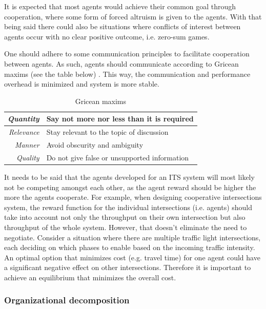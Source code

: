 \documentclass[main.tex]{subfiles}
\begin{document}
It is expected that most agents would achieve their common goal through cooperation, where some
form of forced altruism is given to the agents. With that being said there could also be
situations where conflicts of interest between agents occur with no clear positive outcome,
i.e. zero-sum games.

One should adhere to some communication principles to facilitate cooperation between agents. As
such, agents should communicate according to Gricean maxims (see the table below)
\cite{Shoham}. This way, the communication and performance overhead is minimized and system 
is more stable. 


\begin{table}[htbp]
    \renewcommand{\arraystretch}{1.7}
    \setlength{\tabcolsep}{1em}
    \caption{Gricean maxims}
    \centering\begin{tabular}{>{\itshape}rl}
       \toprule
       Quantity & Say not more nor less than it is required \\ 
       \midrule
       Relevance &  Stay relevant to the topic of discussion \\
       \midrule
       Manner & Avoid obscurity and ambiguity \\ 
       \midrule
       Quality & Do not give false or unsupported information \\
       \bottomrule
    \end{tabular}
    \label{maxims}
\end{table}

It needs to be said that the agents developed for an ITS system will most likely not be competing 
amongst each other, as the agent reward should be higher the more the agents cooperate. For example, 
when designing cooperative intersections system, the reward function for the individual intersections
(i.e. agents) should take into account not only the throughput on their own intersection but also 
throughput of the whole system. However, that doesn't eliminate the need to negotiate. Consider a 
situation where there are multiple traffic light intersections, each deciding on which phases to 
enable based on the incoming traffic intensity. An optimal option that minimizes cost (e.g. 
travel time) for one agent could have a significant negative effect on other intersections. 
Therefore it is important to achieve an equilibrium that minimizes the overall cost. 

\subsubsection{Organizational decomposition}\label{sec-conflicts}
\end{document}
